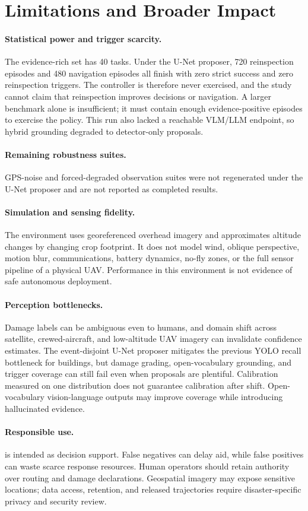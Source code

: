 \section{Limitations and Broader Impact}
\label{sec:limitations}

\paragraph{Statistical power and trigger scarcity.}
The evidence-rich set has 40 tasks.
Under the U-Net proposer, 720 reinspection episodes and 480 navigation
episodes all finish with zero strict success and zero reinspection triggers.
The controller is therefore never exercised, and the study cannot claim that
reinspection improves decisions or navigation.
A larger benchmark alone is insufficient; it must contain enough
evidence-positive episodes to exercise the policy.
This run also lacked a reachable VLM/LLM endpoint, so hybrid grounding
degraded to detector-only proposals.

\paragraph{Remaining robustness suites.}
GPS-noise and forced-degraded observation suites were not regenerated under
the U-Net proposer and are not reported as completed results.

\paragraph{Simulation and sensing fidelity.}
The environment uses georeferenced overhead imagery and approximates altitude changes by changing crop footprint.
It does not model wind, oblique perspective, motion blur, communications, battery dynamics, no-fly zones, or the full sensor pipeline of a physical UAV.
Performance in this environment is not evidence of safe autonomous deployment.

\paragraph{Perception bottlenecks.}
Damage labels can be ambiguous even to humans, and domain shift across satellite, crewed-aircraft, and low-altitude UAV imagery can invalidate confidence estimates.
The event-disjoint U-Net proposer mitigates the previous YOLO recall bottleneck for buildings, but damage grading, open-vocabulary grounding, and trigger coverage can still fail even when proposals are plentiful.
Calibration measured on one distribution does not guarantee calibration after shift.
Open-vocabulary vision-language outputs may improve coverage while introducing hallucinated evidence.

\paragraph{Responsible use.}
\ProjectName is intended as decision support.
False negatives can delay aid, while false positives can waste scarce response resources.
Human operators should retain authority over routing and damage declarations.
Geospatial imagery may expose sensitive locations; data access, retention, and released trajectories require disaster-specific privacy and security review.
